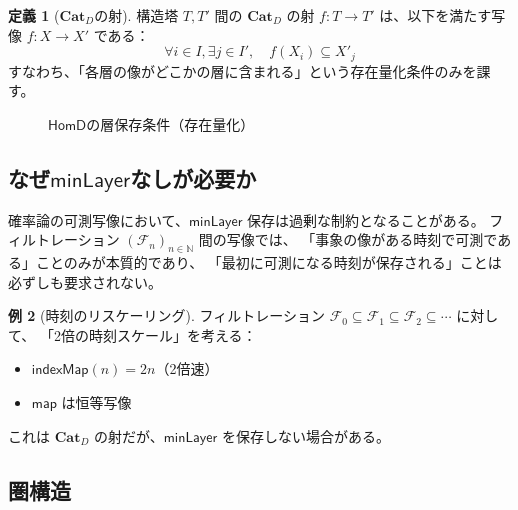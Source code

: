 \documentclass[a4paper,11pt]{ltjsarticle}
\theoremstyle{definition}
\newtheorem{definition}{定義}[section]
\newtheorem{example}[definition]{例}
\theoremstyle{plain}
\newcommand{\CatD}{\mathbf{Cat}_D}
\newcommand{\HomD}{\mathsf{HomD}}
\newcommand{\minLayer}{\mathsf{minLayer}}
\newcommand{\indexMap}{\mathsf{indexMap}}
\begin{document}
\begin{definition}[$\CatD$の射]
\label{def:hom-d}
構造塔 $T, T'$ 間の $\CatD$ の射 $f : T \to T'$ は、以下を満たす写像 $f : X \to X'$ である：
\[
  \forall i \in I, \exists j \in I', \quad f(X_i) \subseteq X'_j
\]
すなわち、「各層の像がどこかの層に含まれる」という存在量化条件のみを課す。
\end{definition}

\begin{figure}[htbp]
\centering
{}
\quad
{}
\caption{$\HomD$の層保存条件（存在量化）}
\label{fig:hom-d}
\end{figure}

\subsection{なぜ$\minLayer$なしが必要か}

\begin{warning}
確率論の可測写像において、$\minLayer$ 保存は過剰な制約となることがある。
フィルトレーション $(\mathcal{F}_n)_{n \in \mathbb{N}}$ 間の写像では、
「事象の像がある時刻で可測である」ことのみが本質的であり、
「最初に可測になる時刻が保存される」ことは必ずしも要求されない。
\end{warning}

\begin{example}[時刻のリスケーリング]
フィルトレーション $\mathcal{F}_0 \subseteq \mathcal{F}_1 \subseteq \mathcal{F}_2 \subseteq \cdots$ に対して、
「2倍の時刻スケール」を考える：
\begin{itemize}
  \item $\indexMap(n) = 2n$（2倍速）
  \item $\mathsf{map}$ は恒等写像
\end{itemize}
これは $\CatD$ の射だが、$\minLayer$ を保存しない場合がある。
\end{example}

\subsection{圏構造}
\end{document}
